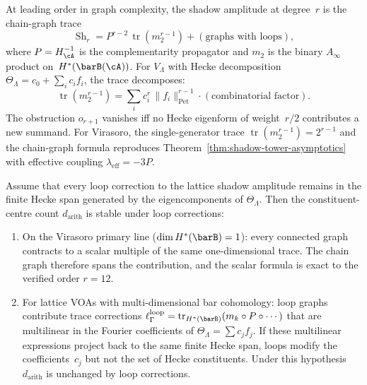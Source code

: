\begin{proposition}
\label{prop:leading-hecke-identification}
\ClaimStatusProvedElsewhere
At leading order in graph complexity, the shadow amplitude at degree~$r$
is the chain-graph trace
\begin{equation}\label{eq:chain-trace}
 \operatorname{Sh}_r
 = P^{r-2}\,\operatorname{tr}(m_2^{r-1})
 + (\text{graphs with loops}),
\end{equation}
where $P = H_\cA^{-1}$ is the complementarity propagator and
$m_2$ is the binary $A_\infty$ product on~$H^*(\barB(\cA))$.
For $V_\Lambda$ with Hecke decomposition
$\Theta_\Lambda = c_0 + \sum_i c_i f_i$, the trace decomposes:
\[
 \operatorname{tr}(m_2^{r-1})
 = \sum_i c_i^r\,\lVert f_i \rVert^{r-1}_{\mathrm{Pet}}
 \cdot (\text{combinatorial factor}).
\]
The obstruction $o_{r+1}$ vanishes iff no Hecke eigenform of
weight~$r/2$ contributes a new summand. For Virasoro, the
single-generator trace $\operatorname{tr}(m_2^{r-1})=2^{r-1}$
and the chain-graph formula reproduces
Theorem~\textup{\ref{thm:shadow-tower-asymptotics}} with effective
coupling $\lambda_{\mathrm{eff}}=-3P$.
\end{proposition}

\begin{proposition}
\label{prop:hecke-all-orders}
\label{prop:loop-corrections}
\ClaimStatusProvedHere
{}
Assume that every loop correction to the lattice shadow amplitude
remains in the finite Hecke span generated by the eigencomponents of
$\Theta_\Lambda$. Then the constituent-centre count
$d_{\mathrm{arith}}$ is stable under loop corrections:
\begin{enumerate}[label=\textup{(\roman*)}]
\item On the Virasoro primary line
 \textup{(}$\dim H^*(\barB) = 1$\textup{)}: every connected graph
 contracts to a scalar multiple of the same one-dimensional trace.
 The chain graph therefore spans the contribution, and the scalar
 formula is exact to the verified order $r = 12$.
\item For lattice VOAs with multi-dimensional bar cohomology: loop
 graphs contribute trace corrections
 $\ell^{\mathrm{loop}}_\Gamma =
 \operatorname{tr}_{H^*(\barB)}(m_k \circ P \circ \cdots)$
 that are multilinear in the Fourier coefficients of
 $\Theta_\Lambda = \sum c_j f_j$. If these multilinear expressions
 project back to the same finite Hecke span, loops modify the
 coefficients~$c_j$ but not the set of Hecke constituents. Under this
 hypothesis $d_{\mathrm{arith}}$ is unchanged by loop corrections.
\end{enumerate}
\end{proposition}

